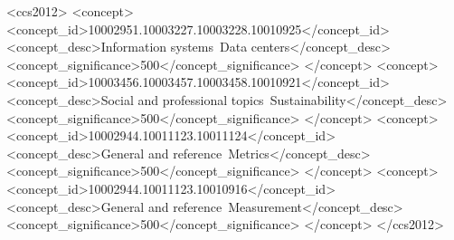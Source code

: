 \documentclass[sigconf]{acmart}
\begin{document}
\begin{CCSXML}
<ccs2012>
   <concept>
       <concept_id>10002951.10003227.10003228.10010925</concept_id>
       <concept_desc>Information systems~Data centers</concept_desc>
       <concept_significance>500</concept_significance>
       </concept>
   <concept>
       <concept_id>10003456.10003457.10003458.10010921</concept_id>
       <concept_desc>Social and professional topics~Sustainability</concept_desc>
       <concept_significance>500</concept_significance>
       </concept>
   <concept>
       <concept_id>10002944.10011123.10011124</concept_id>
       <concept_desc>General and reference~Metrics</concept_desc>
       <concept_significance>500</concept_significance>
       </concept>
   <concept>
       <concept_id>10002944.10011123.10010916</concept_id>
       <concept_desc>General and reference~Measurement</concept_desc>
       <concept_significance>500</concept_significance>
       </concept>
 </ccs2012>
\end{CCSXML}



    \maketitle

    
    
    
    
    \appendix

    
    
\end{document}
